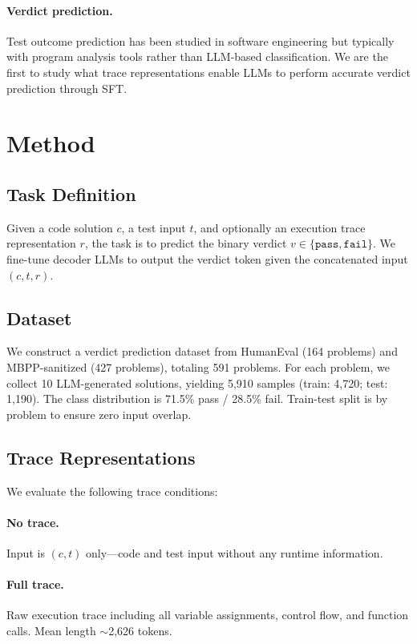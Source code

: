 \documentclass[11pt]{article}
\begin{document}
\paragraph{Verdict prediction.} Test outcome prediction has been studied in software engineering \citep{chen2024chatunitest,xia2024fuzz4all} but typically with program analysis tools rather than LLM-based classification. We are the first to study what trace representations enable LLMs to perform accurate verdict prediction through SFT.

\section{Method}

\subsection{Task Definition}

Given a code solution $c$, a test input $t$, and optionally an execution trace representation $r$, the task is to predict the binary verdict $v \in \{\texttt{pass}, \texttt{fail}\}$. We fine-tune decoder LLMs to output the verdict token given the concatenated input $(c, t, r)$.

\subsection{Dataset}

We construct a verdict prediction dataset from HumanEval (164 problems) and MBPP-sanitized (427 problems), totaling 591 problems. For each problem, we collect 10 LLM-generated solutions, yielding 5,910 samples (train: 4,720; test: 1,190). The class distribution is 71.5\% pass / 28.5\% fail. Train-test split is by problem to ensure zero input overlap.

\subsection{Trace Representations}

We evaluate the following trace conditions:

\paragraph{No trace.} Input is $(c, t)$ only---code and test input without any runtime information.

\paragraph{Full trace.} Raw execution trace including all variable assignments, control flow, and function calls. Mean length $\sim$2,626 tokens.
\end{document}
